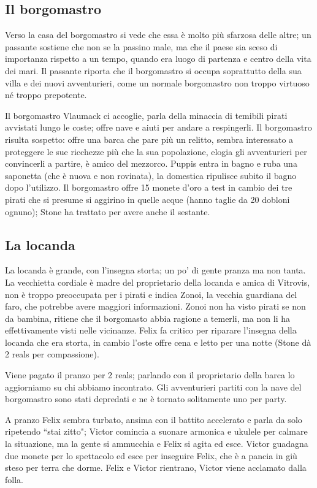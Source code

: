 \documentclass[letterpaper,twocolumn,openany, nodeprecatedcode, nomultitoc]{dndbook}
\begin{document}
\subsection{Il borgomastro}
Verso la casa del borgomastro si vede che essa è molto più sfarzosa delle altre; un passante sostiene che non se la passino male, ma che il paese sia sceso di importanza rispetto a un tempo, quando era luogo di partenza e centro della vita dei mari. Il passante riporta che il borgomastro si occupa soprattutto della sua villa e dei nuovi avventurieri, come un normale borgomastro non troppo virtuoso né troppo prepotente.

Il borgomastro Vlaumack ci accoglie, parla della minaccia di temibili pirati avvistati lungo le coste; offre nave e aiuti per andare a respingerli. Il borgomastro risulta sospetto: offre una barca che pare più un relitto, sembra interessato a proteggere le sue ricchezze più che la sua popolazione, elogia gli avventurieri per convincerli a partire, è amico del mezzorco.
Puppis entra in bagno e ruba una saponetta (che è nuova e non rovinata), la domestica ripulisce subito il bagno dopo l'utilizzo.
Il borgomastro offre 15 monete d'oro a test in cambio dei tre pirati che si presume si aggirino in quelle acque (hanno taglie da 20 dobloni ognuno); Stone ha trattato per avere anche il sestante.

\subsection{La locanda}
La locanda è grande, con l'insegna storta; un po' di gente pranza ma non tanta. La vecchietta cordiale è madre del proprietario della locanda e amica di Vitrovis, non è troppo preoccupata per i pirati e indica Zonoi, la vecchia guardiana del faro, che potrebbe avere maggiori informazioni. Zonoi non ha visto pirati se non da bambina, ritiene che il borgomasto abbia ragione a temerli, ma non li ha effettivamente visti nelle vicinanze. Felix fa critico per riparare l'insegna della locanda che era storta, in cambio l'oste offre cena e letto per una notte (Stone dà 2 reals per compassione).

Viene pagato il pranzo per 2 reals; parlando con il proprietario della barca lo aggiorniamo su chi abbiamo incontrato. Gli avventurieri partiti con la nave del borgomastro sono stati depredati e ne è tornato solitamente uno per party.

A pranzo Felix sembra turbato, ansima con il battito accelerato e parla da solo ripetendo ``stai zitto"; Victor comincia a suonare armonica e ukulele per calmare la situazione, ma la gente si ammucchia e Felix si agita ed esce. Victor guadagna due monete per lo spettacolo ed esce per inseguire Felix, che è a pancia in giù steso per terra che dorme. Felix e Victor rientrano, Victor viene acclamato dalla folla.
\end{document}
